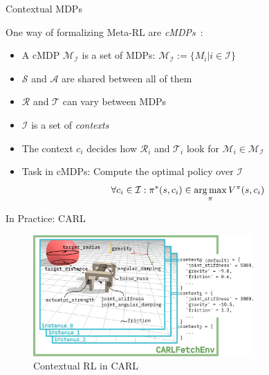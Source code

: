 \documentclass[aspectratio=169]{../latex_main/tntbeamer}  %
\begin{document}
\begin{frame}[c]{Contextual MDPs}
	
One way of formalizing Meta-RL are \emph{cMDPs}~:
\begin{itemize}
    \item A cMDP $\mathcal{M}_{\mathcal{I}}$ is a set of MDPs: $\mathcal{M}_{\mathcal{I}} := \{M_i | i \in \mathcal{I}\}$
    \item $\mathcal{S}$ and $\mathcal{A}$ are shared between all of them
    \item $\mathcal{R}$ and $\mathcal{T}$ can vary between MDPs
    \item $\mathcal{I}$ is a set of \emph{contexts}
    \item The context $c_i$ decides how $\mathcal{R}_i$ and $\mathcal{T}_i$ look for $\mathcal{M}_i \in  \mathcal{M}_{\mathcal{I}}$
    \item Task in cMDPs: Compute the optimal policy over $\mathcal{I}$
		$$ \forall c_i \in \mathcal{I}: \pi^*(s, c_i)  \in \operatorname*{arg\,max}_\pi V^\pi(s, c_i)$$
\end{itemize}
	
\end{frame}
\begin{frame}[c]{In Practice: CARL~}

\begin{figure}
    \centering
    \includegraphics[width=0.75\textwidth]{w09_meta_rl/images/concept}
    \caption{Contextual RL in CARL}
    \label{fig:my_label}
\end{figure}

\end{frame}
\end{document}
